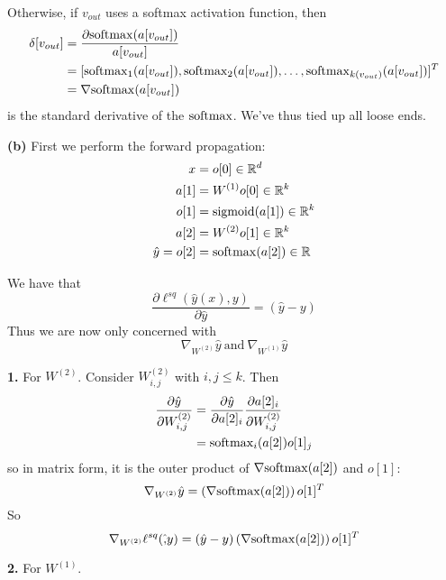 \documentclass[a4paper, 10pt]{article}
\begin{document}
Otherwise, if $v_{out}$ uses a softmax activation function, then
\begin{align*}
    \delta[v_{out}] &= \frac{\partial \mathrm{softmax}(a[v_{out}])}{a[v_{out}]} \\
    &= [\mathrm{softmax}_1(a[v_{out}]), \mathrm{softmax}_2(a[v_{out}]), \ldots, \mathrm{softmax}_{k(v_{out})}(a[v_{out}])]^T \\
    &= \nabla \mathrm{softmax}(a[v_{out}])
\end{align*}
is the standard derivative of the $\mathrm{softmax}$. We've thus tied up all loose ends.
\newpage

\textbf{(b)} First we perform the forward propagation:
\begin{align*}
    x &= o[0] \in \mathbb{R}^d \\
    a[1] &= W^{(1)} o[0] \in \mathbb{R}^k \\
    o[1] &= \mathrm{sigmoid}(a[1]) \in \mathbb{R}^k \\
    a[2] &= W^{(2)} o[1] \in \mathbb{R}^k \\
    \hat{y} = o[2] &= \mathrm{softmax}(a[2]) \in \mathbb{R}
\end{align*}

We have that \begin{equation*}
\frac{\partial \ell^{sq}(\hat{y}(x), y)}{\partial \hat{y}} = (\hat{y} - y)
\end{equation*}
Thus we are now only concerned with \begin{equation*}
\nabla_{W^{(2)}} \hat{y} \:\text{and}\: \nabla_{W^{(1)}} \hat{y}
\end{equation*}
 
\textbf{1.} For $W^{(2)}$. Consider $W^{(2)}_{i, j}$ with $i, j \leq k$. Then 
\begin{align*}
    \frac{\partial \hat{y}}{\partial W^{(2)}_{i, j}}  &= \frac{\partial \hat{y}}{\partial a[2]_i} \frac{\partial a[2]_i}{\partial W^{(2)}_{i, j}} \\
    &= \mathrm{softmax}_i(a[2]) o[1]_j
\end{align*}
so in matrix form, it is the outer product of $\nabla \mathrm{softmax} (a[2])$ and $o[1]$:
\begin{equation*}
\nabla_{W^{(2)}}\hat{y} = \left(\nabla \mathrm{softmax}(a[2])\right) o[1]^T
\end{equation*}
So \begin{equation*}
\nabla_{W^{(2)}} \ell^{sq}(\hat, y) = (\hat{y} - y) \left(\nabla \mathrm{softmax}(a[2])\right) o[1]^T
\end{equation*}

\textbf{2.} For $W^{(1)}$.
\end{document}
